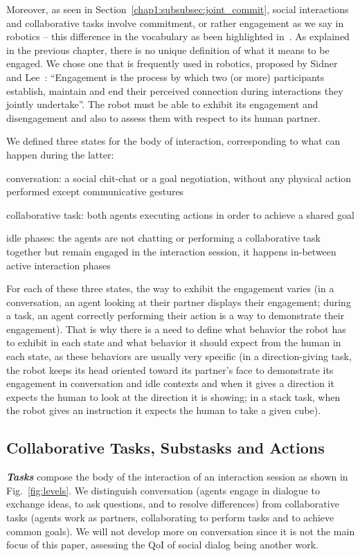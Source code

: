 \documentclass[a4paper,11pt,twoside]{StyleThese}
\begin{document}
Moreover, as seen in Section~\ref{chap1:subsubsec:joint_commit}, social interactions and collaborative tasks involve commitment, or rather engagement as we say in robotics -- this difference in the vocabulary as been highlighted in~\cite{castro_2019_commitments}. As explained in the previous chapter, there is no unique definition of what it means to be engaged. We chose one that is frequently used in robotics, proposed by Sidner and Lee~\cite{sidner_2003_engagement}: ``Engagement is the process by which two (or more) participants establish, maintain and end their perceived connection during interactions they jointly undertake''. The robot must be able to exhibit its engagement and disengagement and also to assess them with respect to its human partner.

We defined three states for the body of interaction, corresponding to what can happen during the latter: 
\begin{bulletList}
	\item conversation: a social chit-chat or a goal negotiation, without any physical action performed except communicative gestures
	\item collaborative task: both agents executing actions in order to achieve a shared goal
	\item idle phases: the agents are not chatting or performing a collaborative task together but remain engaged in the interaction session, it happens in-between active interaction phases
\end{bulletList}

For each of these three states, the way to exhibit the engagement varies (\eg in a conversation, an agent looking at their partner displays their engagement; during a task, an agent correctly performing their action is a way to demonstrate their engagement). That is why there is a need to define what behavior the robot has to exhibit in each state and what behavior it should expect from the human in each state, as these behaviors are usually very specific (\eg in a direction-giving task, the robot keeps its head oriented toward its partner's face to demonstrate its engagement in conversation and idle contexts and when it gives a direction it expects the human to look at the direction it is showing; in a stack task, when the robot gives an instruction it expects the human to take a given cube).


\subsection{Collaborative Tasks, Substasks and Actions}
\textbf{\textit{Tasks}} compose the body of the interaction of an interaction session as shown in Fig.~\ref{fig:levels}. We distinguish conversation (\ie agents engage in dialogue to exchange ideas, to ask questions, and to resolve differences) from collaborative tasks (\ie agents work as partners, collaborating to perform tasks and to achieve common goals). We will not develop more on conversation since it is not the main focus of this paper, assessing the QoI of social dialog being another work.
\end{document}
